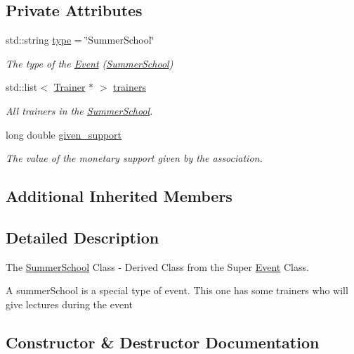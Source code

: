 \subsection*{Private Attributes}
\begin{DoxyCompactItemize}
\item 
std\+::string \hyperlink{classSummerSchool_a4bce94c462b492844cacce921427d212}{type} = \char`\"{}Summer\+School\char`\"{}
\begin{DoxyCompactList}\small\item\em The type of the \hyperlink{classEvent}{Event} (\hyperlink{classSummerSchool}{Summer\+School}) \end{DoxyCompactList}\item 
std\+::list$<$ \hyperlink{classTrainer}{Trainer} $\ast$ $>$ \hyperlink{classSummerSchool_a3208a977c13ce8d7415b179a040efae3}{trainers}
\begin{DoxyCompactList}\small\item\em All trainers in the \hyperlink{classSummerSchool}{Summer\+School}. \end{DoxyCompactList}\item 
long double \hyperlink{classSummerSchool_a7e6899945d6a486e9d1d1f581236630b}{given\+\_\+support}
\begin{DoxyCompactList}\small\item\em The value of the monetary support given by the association. \end{DoxyCompactList}\end{DoxyCompactItemize}
\subsection*{Additional Inherited Members}


\subsection{Detailed Description}
The \hyperlink{classSummerSchool}{Summer\+School} Class -\/ Derived Class from the Super \hyperlink{classEvent}{Event} Class. 

A summer\+School is a special type of event. This one has some trainers who will give lectures during the event 

\subsection{Constructor \& Destructor Documentation}
\mbox{\label{classSummerSchool_af66df445834a36ccb6e67d5503c1b776}} 
